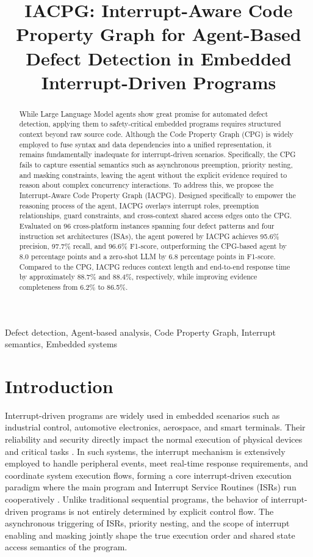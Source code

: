 \documentclass[conference]{IEEEtran}
\title{IACPG: Interrupt-Aware Code Property Graph for Agent-Based Defect Detection in Embedded Interrupt-Driven Programs}
\author{\IEEEauthorblockN{Author}
\IEEEauthorblockA{\textit{Affiliation}\\
email@example.com}}
\begin{document}
\maketitle

\begin{abstract}
While Large Language Model agents show great promise for automated defect detection, applying them to safety-critical embedded programs requires structured context beyond raw source code. Although the Code Property Graph (CPG) is widely employed to fuse syntax and data dependencies into a unified representation, it remains fundamentally inadequate for interrupt-driven scenarios. Specifically, the CPG fails to capture essential semantics such as asynchronous preemption, priority nesting, and masking constraints, leaving the agent without the explicit evidence required to reason about complex concurrency interactions. To address this, we propose the Interrupt-Aware Code Property Graph (IACPG). Designed specifically to empower the reasoning process of the agent, IACPG overlays interrupt roles, preemption relationships, guard constraints, and cross-context shared access edges onto the CPG. Evaluated on 96 cross-platform instances spanning four defect patterns and four instruction set architectures (ISAs), the agent powered by IACPG achieves 95.6\% precision, 97.7\% recall, and 96.6\% F1-score, outperforming the CPG-based agent by 8.0 percentage points and a zero-shot LLM by 6.8 percentage points in F1-score. Compared to the CPG, IACPG reduces context length and end-to-end response time by approximately 88.7\% and 88.4\%, respectively, while improving evidence completeness from 6.2\% to 86.5\%.
\end{abstract}

\begin{IEEEkeywords}
Defect detection, Agent-based analysis, Code Property Graph, Interrupt semantics, Embedded systems 
\end{IEEEkeywords}

\section{Introduction}
Interrupt-driven programs are widely used in embedded scenarios such as industrial control, automotive electronics, aerospace, and smart terminals. Their reliability and security directly impact the normal execution of physical devices and critical tasks \cite{martinez2014hardware, pan2019easy}. In such systems, the interrupt mechanism is extensively employed to handle peripheral events, meet real-time response requirements, and coordinate system execution flows, forming a core interrupt-driven execution paradigm where the main program and Interrupt Service Routines (ISRs) run cooperatively \cite{brylow2004deadline}. Unlike traditional sequential programs, the behavior of interrupt-driven programs is not entirely determined by explicit control flow. The asynchronous triggering of ISRs, priority nesting, and the scope of interrupt enabling and masking jointly shape the true execution order and shared state access semantics of the program.
\end{document}
